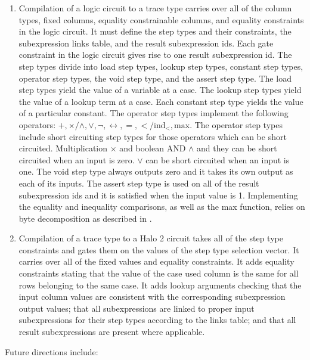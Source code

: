 \documentclass[11pt]{article}
\begin{document}
\begin{enumerate}
	\item Compilation of a logic circuit to a trace type carries over all of the column types, fixed columns, equality constrainable columns, and equality constraints in the logic circuit. It must define the step types and their constraints, the subexpression links table, and the result subexpression ids. Each gate constraint in the logic circuit gives rise to one result subexpression id. The step types divide into load step types, lookup step types, constant step types, operator step types, the void step type, and the assert step type. The load step types yield the value of a variable at a case. The lookup step types yield the value of a lookup term at a case. Each constant step type yields the value of a particular constant. The operator step types implement the following operators: $+, \times / \wedge, \vee, \neg, \leftrightarrow, =, < / \text{ind}_<, \text{max}$. The operator step types include short circuiting step types for those operators which can be short circuited. Multiplication $\times$ and boolean AND $\wedge$ and they can be short circuited when an input is zero. $\vee$ can be short circuited when an input is one. The void step type always outputs zero and it takes its own output as each of its inputs. The assert step type is used on all of the result subexpression ids and it is satisfied when the input value is 1. Implementing the equality and inequality comparisons, as well as the max function, relies on byte decomposition as described in \cite{sigma11}.
	\item Compilation of a trace type to a Halo 2 circuit takes all of the step type constraints and gates them on the values of the step type selection vector. It carries over all of the fixed values and equality constraints. It adds equality constraints stating that the value of the case used column is the same for all rows belonging to the same case. It adds lookup arguments checking that the input column values are consistent with the corresponding subexpression output values; that all subexpressions are linked to proper input subexpressions for their step types according to the links table; and that all result subexpressions are present where applicable.
\end{enumerate}

Future directions include:
\end{document}

